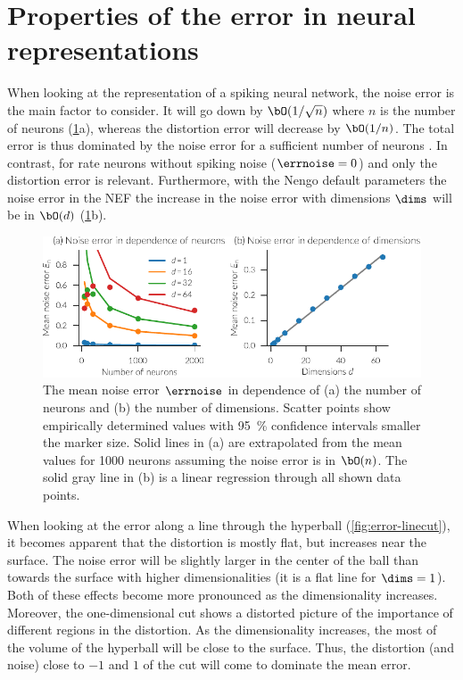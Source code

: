 \section{Properties of the error in neural representations}\label{sec:neural-err}
When looking at the representation of a spiking neural network, the noise error is the main factor to consider.
It will go down by $\bO(1/\sqrt{n})$ where $n$ is the number of neurons (\cref{fig:noise-error}a), whereas the distortion error will decrease by $\bO(1/n)$.
The total error is thus dominated by the noise error for a sufficient number of neurons \parencite[Fig.~2.6]{eliasmith2003}.
In contrast, for rate neurons without spiking noise ($\errnoise = 0$) and only the distortion error is relevant.
Furthermore, with the Nengo default parameters the noise error in the NEF the increase in the noise error with dimensions $\dims$ will be in $\bO(d)$ (\cref{fig:noise-error}b).
\begin{figure}
    \centering
    \includegraphics{figures/noise-error}
    \caption[Mean noise error with $\csdist(\dims + 2)$ distributed intercepts]{The mean noise error $\errnoise$ in dependence of (a) the number of neurons and (b) the number of dimensions. Scatter points show empirically determined values with \SI{95}{\percent} confidence intervals smaller the marker size. Solid lines in (a) are extrapolated from the mean values for \num{1000} neurons assuming the noise error is in $\bO(n)$. The solid gray line in (b) is a linear regression through all shown data points.}\label{fig:noise-error}
\end{figure}

When looking at the error along a line through the hyperball (\cref{fig:error-linecut}), it becomes apparent that the distortion is mostly flat, but increases near the surface.
The noise error will be slightly larger in the center of the ball than towards the surface with higher dimensionalities (it is a flat line for $\dims = 1$).
Both of these effects become more pronounced as the dimensionality increases.
Moreover, the one-dimensional cut shows a distorted picture of the importance of different regions in the distortion.
As the dimensionality increases, the most of the volume of the hyperball will be close to the surface.
Thus, the distortion (and noise) close to $-1$ and $1$ of the cut will come to dominate the mean error.

